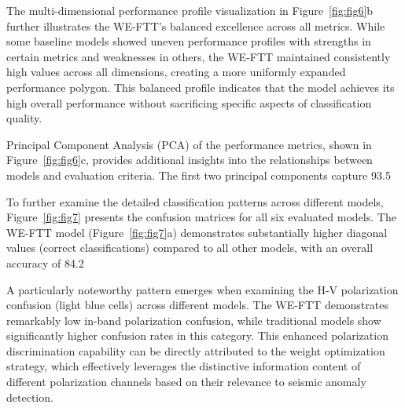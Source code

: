 \documentclass[preprint,review,12pt,authoryear]{elsarticle}
\begin{document}
The multi-dimensional performance profile visualization in Figure~\ref{fig:fig6}b further illustrates the WE-FTT's balanced excellence across all metrics. While some baseline models showed uneven performance profiles with strengths in certain metrics and weaknesses in others, the WE-FTT maintained consistently high values across all dimensions, creating a more uniformly expanded performance polygon. This balanced profile indicates that the model achieves its high overall performance without sacrificing specific aspects of classification quality.

Principal Component Analysis (PCA) of the performance metrics, shown in Figure~\ref{fig:fig6}c, provides additional insights into the relationships between models and evaluation criteria. The first two principal components capture 93.5%

To further examine the detailed classification patterns across different models, Figure~\ref{fig:fig7} presents the confusion matrices for all six evaluated models. The WE-FTT model (Figure~\ref{fig:fig7}a) demonstrates substantially higher diagonal values (correct classifications) compared to all other models, with an overall accuracy of 84.2%

A particularly noteworthy pattern emerges when examining the H-V polarization confusion (light blue cells) across different models. The WE-FTT demonstrates remarkably low in-band polarization confusion, while traditional models show significantly higher confusion rates in this category. This enhanced polarization discrimination capability can be directly attributed to the weight optimization strategy, which effectively leverages the distinctive information content of different polarization channels based on their relevance to seismic anomaly detection.
\end{document}
